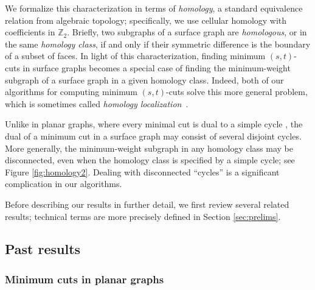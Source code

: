 \documentclass[letterpaper,review]{siamart190516}
\def\Z{\mathbb{Z}}
\begin{document}
We formalize this characterization in terms of \emph{homology}, a standard equivalence relation from algebraic topology; specifically, we use cellular homology with coefficients in $\Z_2$.  Briefly, two subgraphs of a surface graph are \emph{homologous}, or in the same \emph{homology class}, if and only if their symmetric difference is the boundary of a subset of faces.  In light of this characterization, finding minimum $(s,t)$-cuts in surface graphs becomes a special case of finding the minimum-weight subgraph of a surface graph in a given homology class.  Indeed, both of our algorithms for computing minimum $(s,t)$-cuts solve this more general problem, which is sometimes called \emph{homology localization}~\cite{cf-qhc-08,cf-hrhl-10}.

Unlike in planar graphs, where every minimal cut is  dual to a simple cycle \cite{w-pg-33}, the dual of a minimum cut in a surface graph may consist of several disjoint cycles.  More generally, the minimum-weight subgraph in any homology class may be disconnected, even when the homology class is specified by a simple cycle; see Figure \ref{fig:homology2}.  Dealing with disconnected “cycles” is a significant complication in our algorithms.

Before describing our results in further detail, we first review several related results; technical terms are more precisely defined in Section \ref{sec:prelims}.


\subsection{Past results}

\subsubsection*{Minimum cuts in planar graphs}
\end{document}
